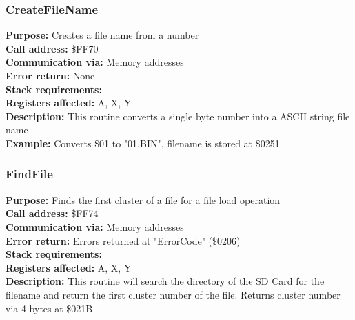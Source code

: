 \subsubsection{CreateFileName}
\textbf{Purpose:} Creates a file name from a number\\
\textbf{Call address:} \$FF70\\
\textbf{Communication via:} Memory addresses\\
\textbf{Error return:} None\\
\textbf{Stack requirements:} \\
\textbf{Registers affected:} A, X, Y\\
\textbf{Description:} This routine converts a single byte number into a ASCII string file name\\
\textbf{Example:} Converts \$01 to "01.BIN", filename is stored at \$0251


\subsubsection{FindFile}
\textbf{Purpose:} Finds the first cluster of a file for a file load operation\\
\textbf{Call address:} \$FF74\\
\textbf{Communication via:} Memory addresses\\
\textbf{Error return:} Errors returned at "ErrorCode" (\$0206)\\
\textbf{Stack requirements:} \\
\textbf{Registers affected:} A, X, Y\\
\textbf{Description:} This routine will search the directory of the SD Card for the filename and return the first cluster number of the file. Returns cluster number via 4 bytes at \$021B\\

\pagebreak
